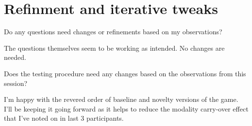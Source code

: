 \section{Refinment and iterative tweaks}

\begin{QandA}
    \item Do any questions need changes or refinements based on my observations?
    \begin{answered}
        The questions themselves seem to be working as intended. No changes are needed.
    \end{answered}

    \item Does the testing procedure need any changes based on the observations from this session?
    \begin{answered}
        I'm happy with the revered order of baseline and novelty versions of the game. I'll be keeping it going forward as it helps to reduce the modality carry-over effect that I've noted on in last 3 participants.
    \end{answered}
\end{QandA}